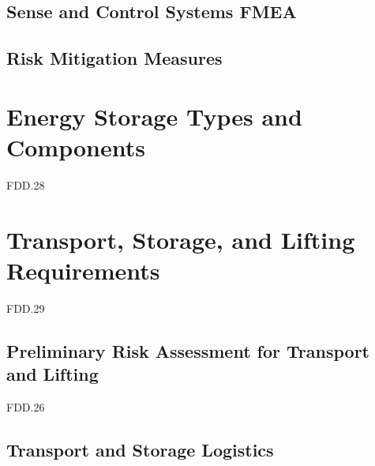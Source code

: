\subsection{Sense and Control Systems FMEA}

\subsection{Risk Mitigation Measures}


\section{ Energy Storage Types and Components}
FDD.28

\section{Transport, Storage, and Lifting Requirements}
FDD.29 
\subsection{Preliminary Risk Assessment for Transport and Lifting}
FDD.26 

\subsection{Transport and Storage Logistics}


\newpage